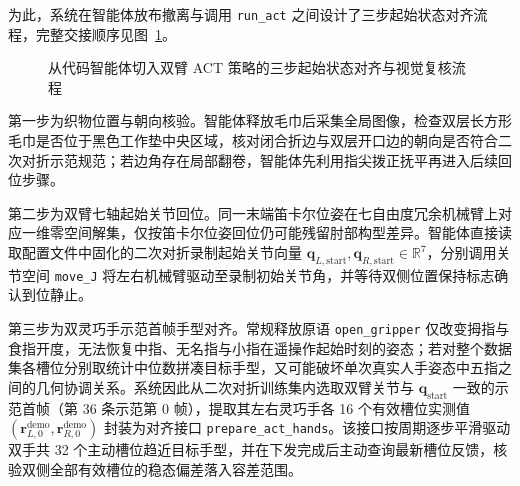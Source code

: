 为此，系统在智能体放布撤离与调用 \texttt{run\_act} 之间设计了三步起始状态对齐流程，完整交接顺序见图~\ref{fig:stage-handoff}。

\begin{figure}[htbp]
\centering
{}
\caption{从代码智能体切入双臂 ACT 策略的三步起始状态对齐与视觉复核流程}
\label{fig:stage-handoff}
\end{figure}

第一步为织物位置与朝向核验。智能体释放毛巾后采集全局图像，检查双层长方形毛巾是否位于黑色工作垫中央区域，核对闭合折边与双层开口边的朝向是否符合二次对折示范规范；若边角存在局部翻卷，智能体先利用指尖拨正抚平再进入后续回位步骤。

第二步为双臂七轴起始关节回位。同一末端笛卡尔位姿在七自由度冗余机械臂上对应一维零空间解集，仅按笛卡尔位姿回位仍可能残留肘部构型差异。智能体直接读取配置文件中固化的二次对折录制起始关节向量 $\bm{q}_{L,\text{start}}, \bm{q}_{R,\text{start}} \in \mathbb{R}^7$，分别调用关节空间 \texttt{move\_J} 将左右机械臂驱动至录制初始关节角，并等待双侧位置保持标志确认到位静止。

第三步为双灵巧手示范首帧手型对齐。常规释放原语 \texttt{open\_gripper} 仅改变拇指与食指开度，无法恢复中指、无名指与小指在遥操作起始时刻的姿态；若对整个数据集各槽位分别取统计中位数拼凑目标手型，又可能破坏单次真实人手姿态中五指之间的几何协调关系。系统因此从二次对折训练集内选取双臂关节与 $\bm{q}_{\text{start}}$ 一致的示范首帧（第 36 条示范第 0 帧），提取其左右灵巧手各 16 个有效槽位实测值 $(\bm{r}_{L,0}^{\text{demo}}, \bm{r}_{R,0}^{\text{demo}})$ 封装为对齐接口 \texttt{prepare\_act\_hands}。该接口按周期逐步平滑驱动双手共 32 个主动槽位趋近目标手型，并在下发完成后主动查询最新槽位反馈，核验双侧全部有效槽位的稳态偏差落入容差范围。

